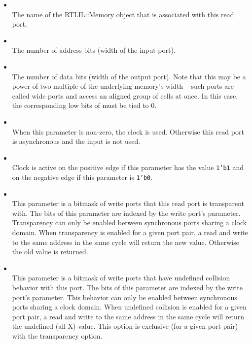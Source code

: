 \begin{itemize}
\item {} \\
The name of the RTLIL::Memory object that is associated with this read port.

\item {} \\
The number of address bits (width of the  input port).

\item {} \\
The number of data bits (width of the  output port).  Note that this may be a power-of-two
multiple of the underlying memory's width -- such ports are called wide ports and access an aligned
group of cells at once.  In this case, the corresponding low bits of  must be tied to 0.

\item {} \\
When this parameter is non-zero, the clock is used. Otherwise this read port is asynchronous and
the  input is not used.

\item {} \\
Clock is active on the positive edge if this parameter has the value {\tt 1'b1} and on the negative
edge if this parameter is {\tt 1'b0}.

\item {} \\
This parameter is a bitmask of write ports that this read port is transparent with.  The bits
of this parameter are indexed by the write port's  parameter.  Transparency can only be
enabled between synchronous ports sharing a clock domain.  When transparency is enabled for a given
port pair, a read and write to the same address in the same cycle will return the new value.
Otherwise the old value is returned.

\item {} \\
This parameter is a bitmask of write ports that have undefined collision behavior with this port.
The bits of this parameter are indexed by the write port's  parameter.  This behavior can only be
enabled between synchronous ports sharing a clock domain.  When undefined collision is enabled for a given
port pair, a read and write to the same address in the same cycle will return the undefined (all-X) value.
This option is exclusive (for a given port pair) with the transparency option.


\end{itemize}
